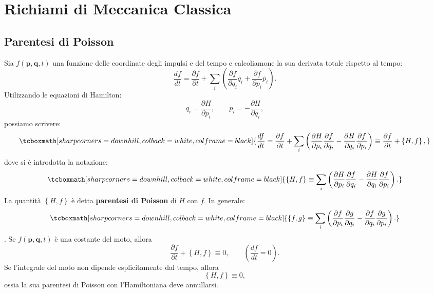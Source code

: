 \chapter{Richiami di Meccanica Classica}
\section[Parentesi di Poisson]{Parentesi di Poisson}
Sia $f(\mathbf{p},\mathbf{q},t)$ una funzione delle coordinate degli impulsi e del tempo e calcoliamone la sua derivata totale rispetto al tempo:
	\begin{equation}
		\frac{df}{dt}= \frac{\partial f}{\partial t} + \sum_i \left( \frac{\partial f}{\partial q_i} \dot {q_i} + \frac{\partial f}{\partial p_i} \dot {p_i} \right).
	\end{equation}
Utilizzando le equazioni di Hamilton:
	\begin{equation}
		\dot{q_i}=\frac{\partial H}{\partial p_i} , \qquad \dot{p_i}=-\frac{\partial H}{\partial q_i} ,
	\end{equation}
possiamo scrivere:
	\begin{equation}
		\tcboxmath[sharp corners=downhill, colback=white, colframe=black]{
			\frac{df}{dt}=	\frac{\partial f}{\partial t} + \sum_i \left( \frac{\partial H}{\partial p_i}\frac{\partial f}{\partial q_i}-\frac{\partial H}{\partial q_i}\frac{\partial f}{\partial p_i}\right) \equiv \frac{\partial f}{\partial t} + \left\lbrace H,f \right\rbrace ,
				}
	\end{equation}
dove si \`e introdotta la notazione:
	\begin{equation}
		\tcboxmath[sharp corners=downhill, colback=white, colframe=black]{
			\left\lbrace H,f \right\rbrace \equiv \sum_i \left(\frac{\partial H}{\partial p_i}\frac{\partial f}{\partial q_i}-\frac{\partial H}{\partial q_i}\frac{\partial f}{\partial p_i}\right)  .
			}
	\end{equation}
La quantit\`a $\left\lbrace H,f \right\rbrace$ è detta \textbf{parentesi di Poisson} di $H$ con $f$. In generale:
	\begin{equation}
		\tcboxmath[sharp corners=downhill, colback=white, colframe=black]{
			\left\lbrace f,g \right\rbrace \equiv \sum_i \left(\frac{\partial f}{\partial p_i}\frac{\partial g}{\partial q_i}-\frac{\partial f}{\partial q_i}\frac{\partial g}{\partial p_i}\right)  .
			}
	\end{equation}.
Se $f(\mathbf{p},\mathbf{q},t)$ \`e una costante del moto, allora
	\begin{equation}
		\frac{\partial f}{\partial t}+\left\lbrace H,f \right\rbrace   \equiv 0 , \qquad
\left( \frac{df}{dt}=0 \right) .
	\end{equation}
Se l'integrale del moto non dipende esplicitamente dal tempo, allora
\begin{equation}
\left\lbrace H,f \right\rbrace  \equiv 0 ,
\end{equation}
ossia la sua parentesi di Poisson con l'Hamiltoniana deve annullarsi.\\

